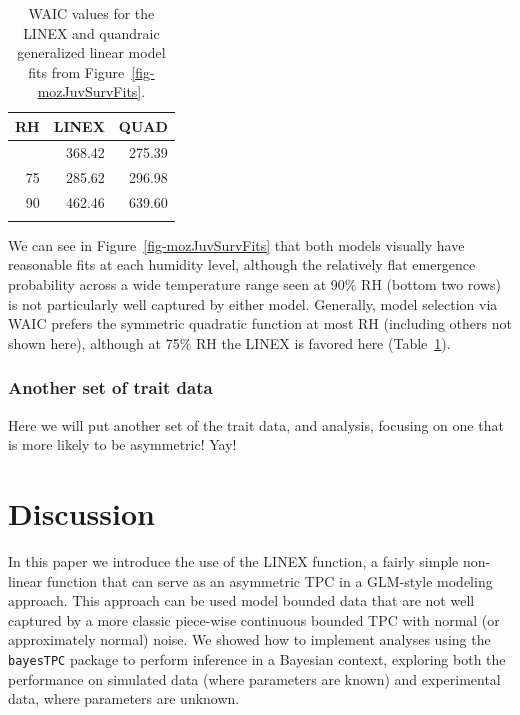 \documentclass[
]{article}
\begin{document}
\begin{longtable}[]{@{}rrr@{}}

\toprule\noalign{}
RH & LINEX & QUAD \\
\midrule\noalign{}
\endhead
\bottomrule\noalign{}
\endlastfoot
45 & 368.42 & 275.39 \\
75 & 285.62 & 296.98 \\
90 & 462.46 & 639.60 \\


\caption{\label{tbl-mozJuvSurvFitsWAIC}WAIC values for the LINEX and
quandraic generalized linear model fits from
Figure~\ref{fig-mozJuvSurvFits}.}

\tabularnewline
\end{longtable}

We can see in Figure~\ref{fig-mozJuvSurvFits} that both models visually
have reasonable fits at each humidity level, although the relatively
flat emergence probability across a wide temperature range seen at 90\%
RH (bottom two rows) is not particularly well captured by either model.
Generally, model selection via WAIC prefers the symmetric quadratic
function at most RH (including others not shown here), although at 75\%
RH the LINEX is favored here (Table~\ref{tbl-mozJuvSurvFitsWAIC}).

\subsubsection{Another set of trait
data}\label{another-set-of-trait-data}

Here we will put another set of the trait data, and analysis, focusing
on one that is more likely to be asymmetric! Yay!

\clearpage

\section{Discussion}\label{discussion}

In this paper we introduce the use of the LINEX function, a fairly
simple non-linear function that can serve as an asymmetric TPC in a
GLM-style modeling approach. This approach can be used model bounded
data that are not well captured by a more classic piece-wise continuous
bounded TPC with normal (or approximately normal) noise. We showed how
to implement analyses using the \texttt{bayesTPC} package to perform
inference in a Bayesian context, exploring both the performance on
simulated data (where parameters are known) and experimental data, where
parameters are unknown.
\end{document}
